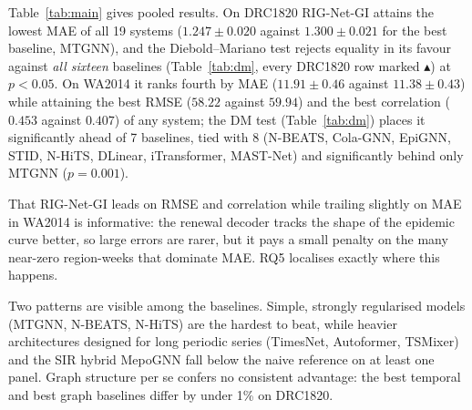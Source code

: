 \documentclass[conference]{IEEEtran}
\begin{document}
Table~\ref{tab:main} gives pooled results. On DRC1820 RIG-Net-GI attains the lowest MAE of all 19 systems ($1.247\pm0.020$ against $1.300\pm0.021$ for the best baseline, MTGNN), and the Diebold--Mariano test rejects equality in its favour against \emph{all sixteen} baselines (Table~\ref{tab:dm}, every DRC1820 row marked $\blacktriangle$) at $p<0.05$. On WA2014 it ranks fourth by MAE ($11.91\pm0.46$ against $11.38\pm0.43$) while attaining the best RMSE ($58.22$ against $59.94$) and the best correlation ($0.453$ against $0.407$) of any system; the DM test (Table~\ref{tab:dm}) places it significantly ahead of 7 baselines, tied with 8 (N-BEATS, Cola-GNN, EpiGNN, STID, N-HiTS, DLinear, iTransformer, MAST-Net) and significantly behind only MTGNN ($p=0.001$).

That RIG-Net-GI leads on RMSE and correlation while trailing slightly on MAE in WA2014 is informative: the renewal decoder tracks the shape of the epidemic curve better, so large errors are rarer, but it pays a small penalty on the many near-zero region-weeks that dominate MAE. RQ5 localises exactly where this happens.

Two patterns are visible among the baselines. Simple, strongly regularised models (MTGNN, N-BEATS, N-HiTS) are the hardest to beat, while heavier architectures designed for long periodic series (TimesNet, Autoformer, TSMixer) and the SIR hybrid MepoGNN fall below the naive reference on at least one panel. Graph structure per se confers no consistent advantage: the best temporal and best graph baselines differ by under 1\% on DRC1820.
\end{document}
